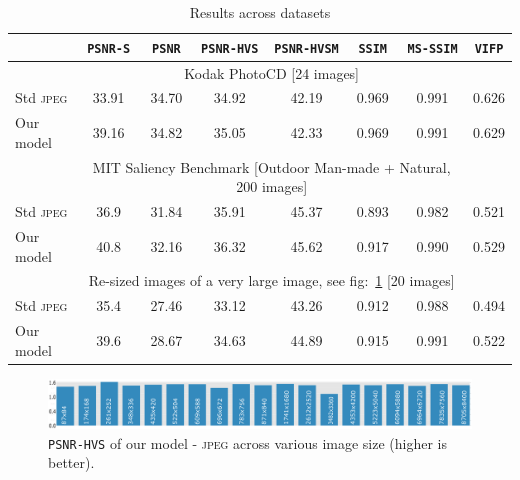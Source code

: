 \begin{table}[H]
\centering
{}
\begin{tabular}{lccccccc}
			 \toprule
               & \texttt{PSNR-S} \phantom{so} & \texttt{PSNR} \phantom{so} & \texttt{PSNR-HVS} \phantom{so}& \texttt{PSNR-HVSM} \phantom{so}& \texttt{SSIM} \phantom{so}& \texttt{MS-SSIM} \phantom{so}& \texttt{VIFP}\phantom{so} \\
              \midrule
              & \multicolumn{6}{c}{Kodak PhotoCD [24 images]}   &                        \\
              \midrule
Std \textsc{jpeg} &   33.91   & 34.70     & 34.92          & 42.19  & 0.969  & 0.991 & 0.626      \\
			  \cline{2-8}
Our model &  39.16    & 34.82    & 35.05          & 42.33  & 0.969  & 0.991 & 0.629     \\
			  \midrule
              & \multicolumn{6}{c}{MIT Saliency Benchmark [Outdoor Man-made + Natural, 200 images]} &              \\
			  \midrule
Std \textsc{jpeg} & 36.9 & 31.84    & 35.91   & 45.37 & 0.893 & 0.982     & 0.521      \\
			  \cline{2-8}
Our model & 40.8 & 32.16   & 36.32   & 45.62 &  0.917 & 0.990      & 0.529      \\
			  \midrule
              & \multicolumn{6}{c}{Re-sized images of a very large image, see fig:~\ref{fig_size} [20 images]} &          \\
			  \midrule
Std \textsc{jpeg} & 35.4   & 27.46  & 33.12 & 43.26     & 0.912 & 0.988 & 0.494     \\
			  \cline{2-8}
Our model & 39.6  & 28.67  & 34.63 & 44.89     & 0.915 & 0.991 & 0.522     \\
			  \toprule
\end{tabular}
\caption[Results across various datasets]{Results across datasets \label{tbl_results}}
\end{table}
        
\begin{figure}[H]
    \centering
    \includegraphics[scale=0.23]{figures/semantic/image_size.pdf}
    \caption[Impact on Image Size]{\texttt{PSNR-HVS} of our model - \textsc{jpeg} across various image size (higher is better). \label{fig_size}}
\end{figure}

